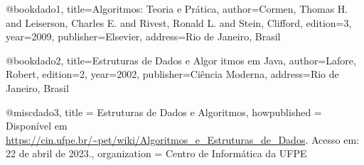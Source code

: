 @book{dado1,
  title={Algoritmos: Teoria e Prática},
  author={Cormen, Thomas H. and Leiserson, Charles E. and Rivest, Ronald L. and Stein, Clifford},
  edition={3},
  year={2009},
  publisher={Elsevier},
  address={Rio de Janeiro, Brasil}
}

@book{dado2,
  title={Estruturas de Dados e Algor
  itmos em Java},
  author={Lafore, Robert},
  edition={2},
  year={2002},
  publisher={Ciência Moderna},
  address={Rio de Janeiro, Brasil}
}

@misc{dado3,
  title = {Estruturas de Dados e Algoritmos},
  howpublished = {Disponível em \url{https://cin.ufpe.br/~pet/wiki/Algoritmos_e_Estruturas_de_Dados}. Acesso em: 22 de abril de 2023.},
  organization = {Centro de Informática da UFPE}
}




